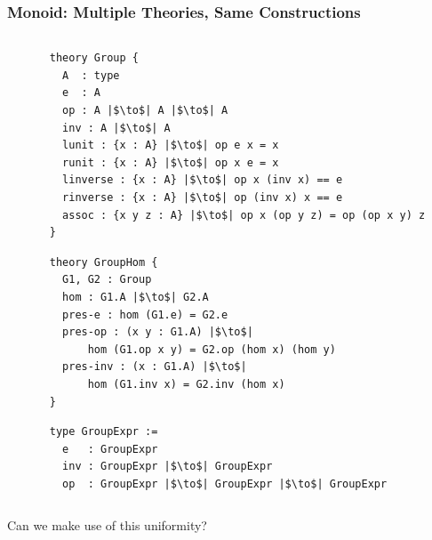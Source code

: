 \documentclass[t,10pt,numbers,fleqn,usenames,xcolor=dvipsnames]{beamer}
\begin{document}
\begin{frame}[fragile]
\frametitle{Monoid: Multiple Theories, Same Constructions}
\begin{columns}
    \begin{column}{0.45\textwidth}

\vspace{0.65cm}

\vspace{0.35cm}          

     \end{column} 
     \begin{column}{0.45\textwidth}
     
        \begin{verbatim}
theory Group {
  A  : type 
  e  : A
  op : A |$\to$| A |$\to$| A
  inv : A |$\to$| A
  lunit : {x : A} |$\to$| op e x = x
  runit : {x : A} |$\to$| op x e = x
  linverse : {x : A} |$\to$| op x (inv x) == e
  rinverse : {x : A} |$\to$| op (inv x) x == e
  assoc : {x y z : A} |$\to$| op x (op y z) = op (op x y) z 
}
        \end{verbatim}     
\begin{verbatim}  
theory GroupHom { 
  G1, G2 : Group 
  hom : G1.A |$\to$| G2.A
  pres-e : hom (G1.e) = G2.e
  pres-op : (x y : G1.A) |$\to$| 
      hom (G1.op x y) = G2.op (hom x) (hom y)
  pres-inv : (x : G1.A) |$\to$| 
      hom (G1.inv x) = G2.inv (hom x)  
}
\end{verbatim}  
\begin{verbatim}  
type GroupExpr := 
  e   : GroupExpr 
  inv : GroupExpr |$\to$| GroupExpr
  op  : GroupExpr |$\to$| GroupExpr |$\to$| GroupExpr
\end{verbatim}           
\end{column}
\end{columns} 
\pause
\vspace{0.5cm}
\scriptsize{Can we make use of this uniformity?}
\end{frame}
\end{document}
